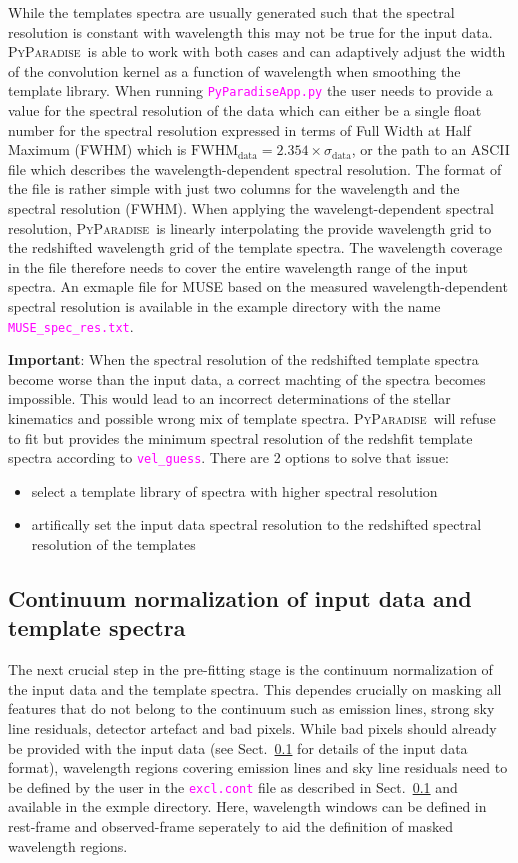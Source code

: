 \documentclass[usenatbib,usegraphicx,useAMS,onecolumn]{mn2e}
\newcommand{\codeline}[1]{\lstinline|#1|}
\newcommand{\fname}[1]{\textcolor{magenta}{\codeline{#1}}}
\newcommand{\PyPar}{\mbox{\textsc{PyParadise}}}
\begin{document}
While the templates spectra are usually generated such that the spectral resolution is constant with wavelength this may not be true for the input data. \PyPar\ is able to work with both cases and can adaptively adjust the width of the convolution kernel as a function of wavelength when smoothing the template library. When running \fname{PyParadiseApp.py} the user needs to provide a value for the spectral resolution of the data which can either be a single float number for the spectral resolution expressed in terms of Full Width at Half Maximum (FWHM) which is $\mathrm{FWHM}_\mathrm{data}=2.354\times\sigma_\mathrm{data}$, or the path to an ASCII file which describes the wavelength-dependent spectral resolution. The format of the file is rather simple with just two columns for the wavelength and the spectral resolution (FWHM). When applying the wavelengt-dependent spectral resolution, \PyPar\ is linearly interpolating the provide wavelength grid to the redshifted wavelength grid of the template spectra. The wavelength coverage in the file therefore needs to cover the entire wavelength range of the input spectra. An exmaple file for MUSE based on the measured wavelength-dependent spectral resolution \citep{} is available in the example directory with the name \fname{MUSE_spec_res.txt}.

\begin{tcolorbox}
 \textbf{Important}: When the spectral resolution of the redshifted template spectra become worse than the input data, a correct machting of the spectra becomes impossible. This would lead to an incorrect determinations of the stellar kinematics and possible wrong mix of template spectra. \PyPar\ will refuse to fit but provides the minimum spectral resolution of the redshfit template spectra according to \fname{vel_guess}. There are 2 options to solve that issue:
 \begin{itemize}
  \item select a template library of spectra with higher spectral resolution
  \item artifically set the input data spectral resolution to the redshifted spectral resolution of the templates
 \end{itemize}
\end{tcolorbox}

\subsection{Continuum normalization of input data and template spectra}
The next crucial step in the pre-fitting stage is the continuum normalization of the input data and the template spectra. This dependes crucially on masking all features that do not belong to the continuum such as emission lines, strong sky line residuals, detector artefact and bad pixels.  While bad pixels should already be provided with the input data (see Sect.~\ref{} for details of the input data format), wavelength regions covering emission lines and sky line residuals need to be defined by the user in the \fname{excl.cont} file as described in Sect.~\ref{} and available in the exmple directory. Here, wavelength windows can be defined in rest-frame and observed-frame seperately to aid the definition of masked wavelength regions.
\end{document}
